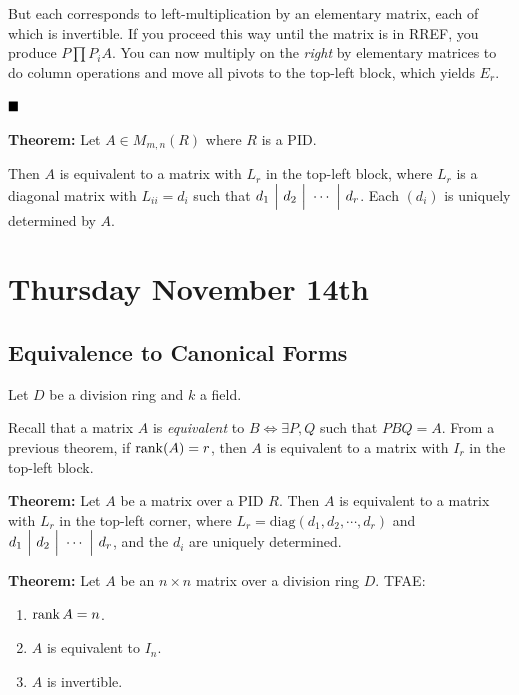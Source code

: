 But each corresponds to left-multiplication by an elementary matrix,
each of which is invertible. If you proceed this way until the matrix is
in RREF, you produce \(P \prod P_i A\). You can now multiply on the
\emph{right} by elementary matrices to do column operations and move all
pivots to the top-left block, which yields \(E_r\).

\(\qed\)

\textbf{Theorem:} Let \(A \in M_{m, n}(R)\) where \(R\) is a PID.

Then \(A\) is equivalent to a matrix with \(L_r\) in the top-left block,
where \(L_r\) is a diagonal matrix with \(L_{ii} = d_i\) such that
\(d_1 {~\Bigm| ~} d_2 {~\Bigm| ~} \cdots {~\Bigm| ~} d_r\). Each \((d_i)\) is
uniquely determined by \(A\).

\hypertarget{thursday-november-14th}{%
\section{Thursday November 14th}\label{thursday-november-14th}}

\hypertarget{equivalence-to-canonical-forms}{%
\subsection{Equivalence to Canonical
Forms}\label{equivalence-to-canonical-forms}}

Let \(D\) be a division ring and \(k\) a field.

Recall that a matrix \(A\) is \emph{equivalent} to
\(B \iff \exists P, Q\) such that \(PBQ=A\). From a previous theorem, if
\(\operatorname{rank}(A) = r\), then \(A\) is equivalent to a matrix with \(I_r\) in
the top-left block.

\textbf{Theorem:} Let \(A\) be a matrix over a PID \(R\). Then \(A\) is
equivalent to a matrix with \(L_r\) in the top-left corner, where
\(L_r = \mathrm{diag}(d_1, d_2, \cdots, d_r)\) and
\(d_1 {~\Bigm| ~} d_2 {~\Bigm| ~} \cdots {~\Bigm| ~} d_r\), and the \(d_i\) are
uniquely determined.

\textbf{Theorem:} Let \(A\) be an \(n\times n\) matrix over a division
ring \(D\). TFAE:

\begin{enumerate}
\def\labelenumi{\arabic{enumi}.}
\item
  \(\operatorname{rank} A = n\).
\item
  \(A\) is equivalent to \(I_n\).
\item
  \(A\) is invertible.
\end{enumerate}


